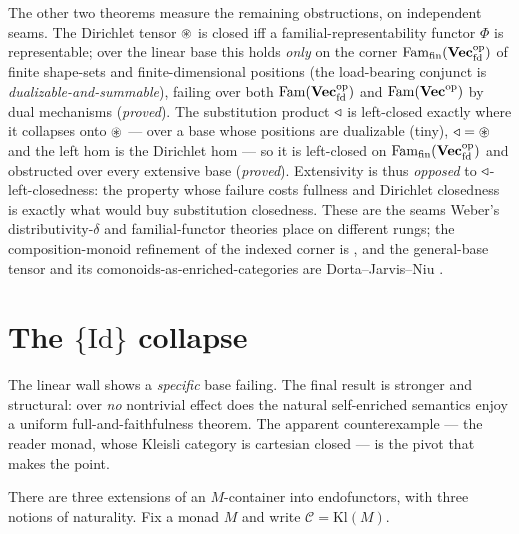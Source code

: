 The other two theorems measure the remaining obstructions, on independent seams.
The Dirichlet tensor $\circledast$ is closed iff a familial-representability functor
$\Phi$ is representable; over the linear base this holds \emph{only} on the corner
$\mathrm{Fam}_{\mathrm{fin}}(\mathbf{Vec}_{\mathrm{fd}}^{\mathrm{op}})$ of finite shape-sets and
finite-dimensional positions (the load-bearing conjunct is
\emph{dualizable-and-summable}), failing over both $\mathrm{Fam}(\mathbf{Vec}_{\mathrm{fd}}^{\mathrm{op}})$
and $\mathrm{Fam}(\mathbf{Vec}^{\mathrm{op}})$ by dual mechanisms (\emph{proved}). The substitution
product $\triangleleft$ is left-closed exactly where it collapses onto $\circledast$ --- over a
base whose positions are dualizable (tiny), $\triangleleft=\circledast$ and the left hom is the
Dirichlet hom --- so it is left-closed on
$\mathrm{Fam}_{\mathrm{fin}}(\mathbf{Vec}_{\mathrm{fd}}^{\mathrm{op}})$ and obstructed over every
extensive base (\emph{proved}). Extensivity is thus \emph{opposed} to
$\triangleleft$-left-closedness: the property whose failure costs fullness and Dirichlet
closedness is exactly what would buy substitution closedness. These are the seams
Weber's distributivity-$\delta$ and familial-functor theories
\cite{WeberPoly,WeberFamilial} place on different rungs; the composition-monoid
refinement of the indexed corner is \cite{DPUV}, and the general-base tensor and
its comonoids-as-enriched-categories are Dorta--Jarvis--Niu \cite{DJN}.

\section{The $\{\mathrm{Id}\}$ collapse}
\label{sec:cob-collapse}

The linear wall shows a \emph{specific} base failing. The final result is
stronger and structural: over \emph{no} nontrivial effect does the natural
self-enriched semantics enjoy a uniform full-and-faithfulness theorem. The
apparent counterexample --- the reader monad, whose Kleisli category is cartesian
closed --- is the pivot that makes the point.

There are three extensions of an $M$-container into endofunctors, with three
notions of naturality. Fix a monad $M$ and write $\mathcal{C}=\mathrm{Kl}(M)$.

